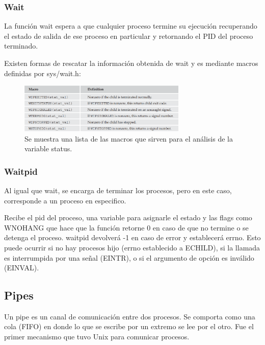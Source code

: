 \documentclass[journal]{IEEEtai}
\begin{document}
\subsubsection{Wait} La función wait espera a que cualquier proceso termine su ejecución recuperando el estado de salida de ese proceso en particular y retornando el PID del proceso terminado.



Existen formas de rescatar la información obtenida de wait y es mediante macros definidas por sys/wait.h:

\begin{figure}[H]
\centering
\includegraphics[width=8cm]{img/macroswait.png}
\caption{Se muestra una lista de las macros que sirven para el análisis de la variable status.}
\label{fig}
\end{figure}



\subsubsection{Waitpid} Al igual que wait, se encarga de terminar los procesos, pero en este caso, corresponde a un proceso en especifico.



Recibe el pid del proceso, una variable para asignarle el estado y las flags como WNOHANG que hace que la función retorne 0 en caso de que no termine o se detenga el proceso. waitpid devolverá -1 en caso de error y establecerá errno. Esto puede ocurrir si no hay procesos hijo (errno establecido a ECHILD), si la llamada es interrumpida por una señal (EINTR), o si el argumento de opción es inválido (EINVAL).

\subsection{Pipes}

Un pipe es un canal de comunicación entre dos procesos. Se comporta como una cola (FIFO)
en donde lo que se escribe por un extremo se lee por el otro. Fue el primer mecanismo que
tuvo Unix para comunicar procesos.
\end{document}
